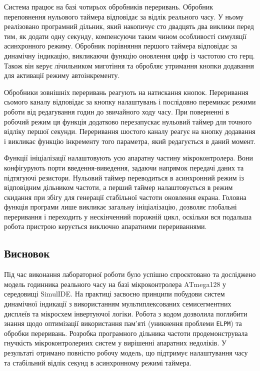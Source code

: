 \documentclass[14pt, a4paper]{extreport}
\begin{document}
	Система працює на базі чотирьох обробників переривань. Обробник переповнення нульового таймера відповідає за відлік реального часу. У ньому реалізовано програмний дільник, який накопичує сто двадцять два виклики перед тим, як додати одну секунду, компенсуючи таким чином особливості симуляції асинхронного режиму. Обробник порівняння першого таймера відповідає за динамічну індикацію, викликаючи функцію оновлення цифр із частотою сто герц. Також він керує лічильником миготіння та обробляє утримання кнопки додавання для активації режиму автоінкременту.
	
	Обробники зовнішніх переривань реагують на натискання кнопок. Переривання сьомого каналу відповідає за кнопку налаштувань і послідовно перемикає режими роботи від редагування годин до звичайного ходу часу. При поверненні в робочий режим ця функція додатково перезапускає нульовий таймер для точного відліку першої секунди. Переривання шостого каналу реагує на кнопку додавання і викликає функцію інкременту того параметра, який редагується в даний момент.
	
	Функції ініціалізації налаштовують усю апаратну частину мікроконтролера. Вони конфігурують порти введення-виведення, задаючи напрямок передачі даних та підтягуючі резистори. Нульовий таймер переводиться в асинхронний режим із відповідним дільником частоти, а перший таймер налаштовується в режим скидання при збігу для генерації стабільної частоти оновлення екрана. Головна функція програми лише викликає загальну ініціалізацію, дозволяє глобальні переривання і переходить у нескінченний порожній цикл, оскільки вся подальша робота пристрою керується виключно апаратними перериваннями.
	
	\subsection*{Висновок}
	
	Під час виконання лабораторної роботи було успішно спроєктовано та досліджено модель годинника реального часу на базі мікроконтролера ATmega128 у середовищі SimulIDE. На практиці засвоєно принципи побудови систем динамічної індикації з використанням мультиплексованих семисегментних дисплеїв та мікросхем інвертуючої логіки. Робота з кодом дозволила поглибити знання щодо оптимізації використання пам'яті (уникнення проблеми \texttt{ELPM}) та обробки переривань. Розробка програмного дільника частоти продемонструвала гнучкість мікроконтролерних систем у вирішенні апаратних недоліків. У результаті отримано повністю робочу модель, що підтримує налаштування часу та стабільний відлік секунд в асинхронному режимі таймера.
	
\end{document}
